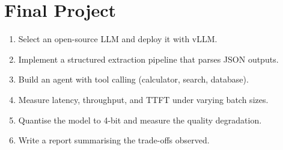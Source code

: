 \documentclass[11pt,a4paper]{book}
\theoremstyle{definition}
\begin{document}
\section{Final Project}

\begin{enumerate}
	\item Select an open-source LLM and deploy it with vLLM.
	\item Implement a structured extraction pipeline that parses JSON outputs.
	\item Build an agent with tool calling (calculator, search, database).
	\item Measure latency, throughput, and TTFT under varying batch sizes.
	\item Quantise the model to 4-bit and measure the quality degradation.
	\item Write a report summarising the trade-offs observed.
\end{enumerate}
\end{document}
